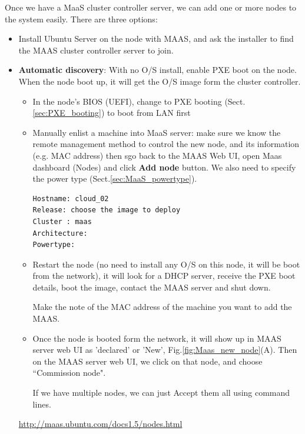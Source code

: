 Once we have a MaaS cluster controller server, we can add one or more nodes to
the system easily. There are three options:
\begin{itemize}
  \item Install Ubuntu Server on the node with MAAS, and ask the installer to
  find the MAAS cluster controller server to join. 
  
  \item {\bf Automatic discovery}: With no O/S install, enable PXE boot on the
  node.  When the node boot up, it will get the O/S image form the cluster
  controller.
  
\begin{itemize}
  \item In the node's BIOS (UEFI), change to PXE booting
  (Sect.\ref{sec:PXE_booting}) to boot from LAN first
  
  \item Manually enlist a machine into MaaS server: make sure we know the
  remote management method to control the new node, and its information (e.g.
  MAC address) then sgo back to the MAAS Web UI, open Maas dashboard (Nodes) and
  click {\bf Add node} button. We also need to specify the power type
  (Sect.\ref{sec:MaaS_powertype}).
  
\begin{verbatim}
Hostname: cloud_02
Release: choose the image to deploy
Cluster : maas 
Architecture: 
Powertype: 
\end{verbatim}    
 

  \item Restart the node (no need to install any O/S on this node, it will be
  boot from the network), it will look for a DHCP server, receive the PXE boot
  details, boot the image, contact the MAAS server and shut down.
  
  Make the note of the MAC address of the machine you want to add the MAAS. 

  \item Once the node is booted form the network, it will show up in MAAS server
  web UI as 'declared' or 'New', Fig.\ref{fig:Maas_new_node}(A).  Then on the
  MAAS server web UI, we click on that node,  and choose ``Commission node". 
  
  If we have multiple nodes, we can just Accept them all using command lines.
\end{itemize}
\url{http://maas.ubuntu.com/docs1.5/nodes.html}  

\end{itemize}

